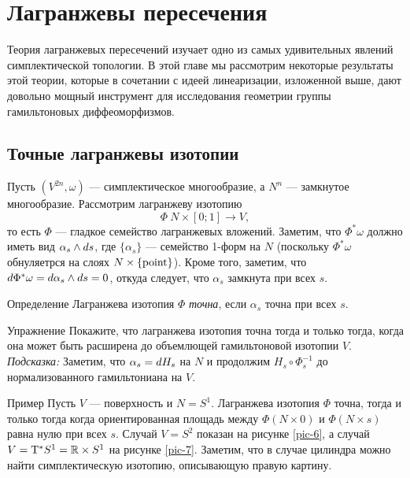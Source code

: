 \chapter{Лагранжевы пересечения}\label{chap:6}

Теория лагранжевых пересечений изучает одно из самых удивительных явлений симплектической топологии.
В этой главе мы рассмотрим некоторые результаты этой теории, которые в сочетании с идеей линеаризации, изложенной выше, дают довольно мощный инструмент для исследования геометрии группы гамильтоновых диффеоморфизмов.

\section{Точные лагранжевы изотопии}
Пусть $(V^{2n}, \omega)$ — симплектическое многообразие, а $N^n$ —
замкнутое многообразие. 
Рассмотрим лагранжеву изотопию
\[\Phi\: N \times [0;1] \to V,\]
то есть $\Phi$ — гладкое семейство лагранжевых вложений.
Заметим, что $\Phi^\ast \omega$ должно иметь вид $\alpha_s \wedge d
s$, где $\{\alpha_s\}$ — семейство 1-форм на $N$ (поскольку
$\Phi^\ast \omega$ обнуляетрся на слоях $N \times \{\mathrm{point}\}$). 
Кроме того, заметим, что $d \Phi^\ast \omega = d \alpha_s \wedge d
s = 0$, откуда следует, что $\alpha_s$ замкнута при всех $s$. 

\begin{ex*}{Определение}
Лагранжева изотопия $\Phi$ \emph{точна}, если $\alpha_s$ точна при всех $s$.
\end{ex*}

\begin{ex}{Упражнение}\label{6.1.A}
Покажите, что лагранжева изотопия точна тогда и только тогда, когда
она может быть расширена до объемлющей гамильтоновой изотопии $V$. 
\emph{Подсказка:} Заметим, что $\alpha_s \z= \d  H_s$ на $N$ и продолжим $H_s
\circ \Phi^{-1}_s$ до нормализованного гамильтониана на $V$. 
\end{ex}

\begin{ex*}{Пример}
Пусть $V$ — поверхность и $N = S^1$.
Лагранжева изотопия $\Phi$ точна, тогда и только тогда когда
ориентированная площадь между $\Phi (N \times {0})$ и $\Phi (N \times
{s})$ равна нулю при всех $s$. 
Случай $V = S^2$ показан на рисунке \ref{pic-6}, а  случай $V = \T^\ast S^1 \z= \RR \times S^1$ на рисунке \ref{pic-7}.
Заметим, что в случае цилиндра можно найти симплектическую изотопию, описывающую правую картину.
\end{ex*}


